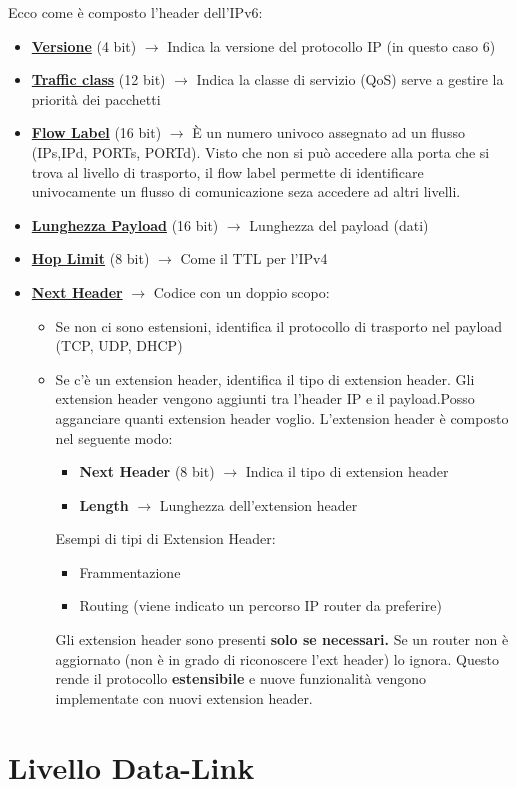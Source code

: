 \documentclass[a4paper]{article}
\begin{document}
Ecco come è composto l'header dell'IPv6:
\begin{itemize}
  \item \textbf{\underline{Versione}} (4 bit) $\rightarrow$ Indica la versione del protocollo IP (in questo caso 6)
  \item \textbf{\underline{Traffic class}} (12 bit) $\rightarrow$ Indica la classe di servizio (QoS) serve a gestire la priorità dei pacchetti
  \item \textbf{\underline{Flow Label}} (16 bit) $\rightarrow$ È un numero univoco assegnato ad un flusso (IPs,IPd, PORTs, PORTd). Visto 
  che non si può accedere alla porta che si trova al livello di trasporto, il flow label permette di identificare univocamente un flusso di comunicazione seza accedere ad altri livelli.
  \item \textbf{\underline{Lunghezza Payload}} (16 bit) $\rightarrow$ Lunghezza del payload (dati)
  \item \textbf{\underline{Hop Limit}} (8 bit) $\rightarrow$ Come il TTL per l'IPv4
  \item \textbf{\underline{Next Header}} $\rightarrow$ Codice con un doppio scopo:
  \begin{itemize}
    \item Se non ci sono estensioni, identifica il protocollo di trasporto nel payload (TCP, UDP, DHCP)
    \item Se c'è un extension header, identifica il tipo di extension header. Gli extension header vengono aggiunti tra l'header IP e il payload.Posso agganciare quanti extension header voglio.
    L'extension header è composto nel seguente modo: 
    \begin{itemize}
      \item \textbf{Next Header} (8 bit) $\rightarrow$ Indica il tipo di extension header
      \item \textbf{Length} $\rightarrow$ Lunghezza dell'extension header
    \end{itemize}
    Esempi di tipi di Extension Header:
    \begin{itemize}
      \item Frammentazione
      \item Routing (viene indicato un percorso IP router da preferire)
    \end{itemize}
  Gli extension header sono presenti \textbf{solo se necessari.} Se un router non è aggiornato
  (non è in grado di riconoscere l'ext header) lo ignora. Questo rende il protocollo \textbf{estensibile} e nuove 
  funzionalità vengono implementate con nuovi extension header.
  \end{itemize}
\end{itemize}

\pagebreak

\section{Livello Data-Link}
\end{document}
